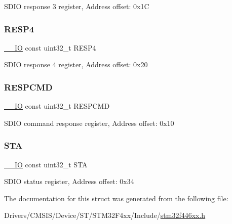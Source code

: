 S\+D\+IO response 3 register, Address offset\+: 0x1C \mbox{\label{struct_s_d_i_o___type_def_aa74faef460a0c655439bcf20caac1653}} 
\subsubsection{\texorpdfstring{R\+E\+S\+P4}{RESP4}}
{\footnotesize\ttfamily \mbox{\hyperlink{core__sc300_8h_aec43007d9998a0a0e01faede4133d6be}{\+\_\+\+\_\+\+IO}} const uint32\+\_\+t R\+E\+S\+P4}

S\+D\+IO response 4 register, Address offset\+: 0x20 \mbox{\label{struct_s_d_i_o___type_def_a195d1a8a6ae4f6072f4e4b62298051fe}} 
\subsubsection{\texorpdfstring{R\+E\+S\+P\+C\+MD}{RESPCMD}}
{\footnotesize\ttfamily \mbox{\hyperlink{core__sc300_8h_aec43007d9998a0a0e01faede4133d6be}{\+\_\+\+\_\+\+IO}} const uint32\+\_\+t R\+E\+S\+P\+C\+MD}

S\+D\+IO command response register, Address offset\+: 0x10 \mbox{\label{struct_s_d_i_o___type_def_a0633c88accff51e7cc9d1e9c3db950d9}} 
\subsubsection{\texorpdfstring{S\+TA}{STA}}
{\footnotesize\ttfamily \mbox{\hyperlink{core__sc300_8h_aec43007d9998a0a0e01faede4133d6be}{\+\_\+\+\_\+\+IO}} const uint32\+\_\+t S\+TA}

S\+D\+IO status register, Address offset\+: 0x34 

The documentation for this struct was generated from the following file\+:\begin{DoxyCompactItemize}
\item 
Drivers/\+C\+M\+S\+I\+S/\+Device/\+S\+T/\+S\+T\+M32\+F4xx/\+Include/\mbox{\hyperlink{stm32f446xx_8h}{stm32f446xx.\+h}}\end{DoxyCompactItemize}
